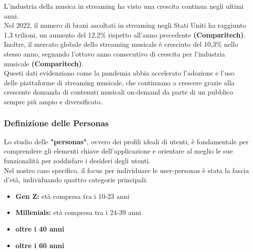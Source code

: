 \documentclass{article}
\begin{document}
		L'industria della musica in streaming ha visto una crescita continua negli ultimi anni. \\Nel 2022, il numero di brani ascoltati in streaming negli Stati Uniti ha raggiunto 1,3 trilioni, un aumento del 12,2\% rispetto all'anno precedente \textbf{(Comparitech)}. Inoltre, il mercato globale dello streaming musicale è cresciuto del 10,3\% nello stesso anno, segnando l'ottavo anno consecutivo di crescita per l'industria musicale \textbf{(Comparitech)}.\\
		Questi dati evidenziano come la pandemia abbia accelerato l'adozione e l'uso delle piattaforme di streaming musicale, che continuano a crescere grazie alla crescente domanda di contenuti musicali on-demand da parte di un pubblico sempre più ampio e diversificato.
			\subsubsection{Definizione delle Personas}
			Lo studio delle \textbf{"personas"}, ovvero dei profili ideali di utenti, è fondamentale per comprendere gli elementi chiave dell'applicazione e orientare al meglio le sue funzionalità per soddisfare i desideri degli utenti.\\Nel nostro caso specifico, il focus per individuare le user-personas è stata la fascia d'età, individuando quattro categorie principali:
			
			\begin{itemize}
				\item \textbf{Gen Z:} età compresa tra i 10-23 anni
				\item \textbf{Millenials:} età compresa tra i 24-39 anni
				\item \textbf{oltre i 40 anni}
				\item \textbf{oltre i 60 anni}
			\end{itemize}
			
\end{document}
